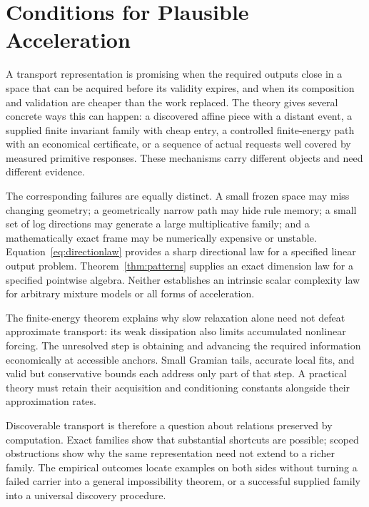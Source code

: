 \documentclass[journal]{IEEEtran}
\theoremstyle{definition}
\begin{document}
\section{Conditions for Plausible Acceleration}
A transport representation is promising when the required outputs close in
a space that can be acquired before its validity expires, and when its
composition and validation are cheaper than the work replaced. The theory
gives several concrete ways this can happen: a discovered affine piece
with a distant event, a supplied finite invariant family with cheap entry,
a controlled finite-energy path with an economical certificate, or a
sequence of actual requests well covered by measured primitive responses.
These mechanisms carry different objects and need different evidence.

The corresponding failures are equally distinct. A small frozen space may
miss changing geometry; a geometrically narrow path may hide rule memory;
a small set of log directions may generate a large multiplicative family;
and a mathematically exact frame may be numerically expensive or unstable.
Equation~\eqref{eq:directionlaw} provides a sharp directional law for a
specified linear output problem. Theorem~\ref{thm:patterns} supplies an
exact dimension law for a specified pointwise algebra. Neither establishes
an intrinsic scalar complexity law for arbitrary mixture models or all
forms of acceleration.

The finite-energy theorem explains why slow relaxation alone need not
defeat approximate transport: its weak dissipation also limits accumulated
nonlinear forcing. The unresolved step is obtaining and advancing the
required information economically at accessible anchors. Small Gramian tails,
accurate local fits, and valid but conservative bounds each address only
part of that step. A practical theory must retain their acquisition and
conditioning constants alongside their approximation rates.

Discoverable transport is therefore a question about relations preserved
by computation. Exact families show that substantial shortcuts are possible;
scoped obstructions show why the same representation need not extend to a
richer family. The empirical outcomes locate examples on both sides without
turning a failed carrier into a general impossibility theorem, or a successful
supplied family into a universal discovery procedure.

\appendices
\end{document}
